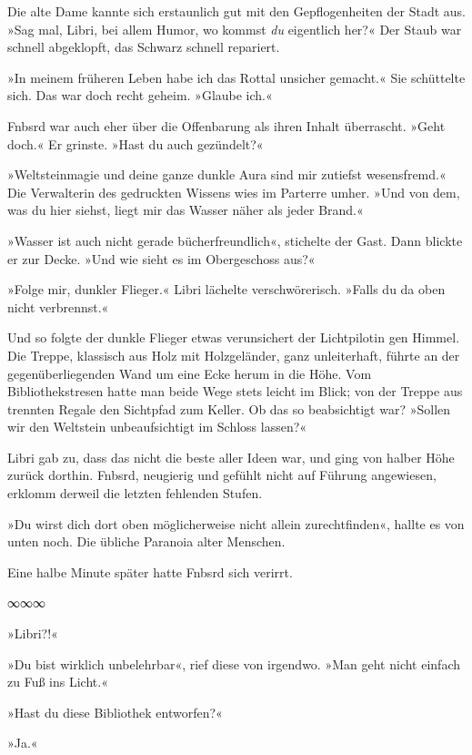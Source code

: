 Die alte Dame kannte sich erstaunlich gut mit den Gepflogenheiten der Stadt aus. »Sag mal, Libri, bei allem Humor, wo kommst \emph{du} eigentlich her?« Der Staub war schnell abgeklopft, das Schwarz schnell repariert.

»In meinem früheren Leben habe ich das Rottal unsicher gemacht.« Sie schüttelte sich. Das war doch recht geheim. »Glaube ich.«

Fnbsrd war auch eher über die Offenbarung als ihren Inhalt überrascht. »Geht doch.« Er grinste. »Hast du auch gezündelt?«

»Weltsteinmagie und deine ganze dunkle Aura sind mir zutiefst wesensfremd.« Die Verwalterin des gedruckten Wissens wies im Parterre umher. »Und von dem, was du hier siehst, liegt mir das Wasser näher als jeder Brand.«

»Wasser ist auch nicht gerade bücherfreundlich«, stichelte der Gast. Dann blickte er zur Decke. »Und wie sieht es im Obergeschoss aus?«

»Folge mir, dunkler Flieger.« Libri lächelte verschwörerisch. »Falls du da oben nicht verbrennst.«

Und so folgte der dunkle Flieger etwas verunsichert der Lichtpilotin gen Himmel. Die Treppe, klassisch aus Holz mit Holzgeländer, ganz unleiterhaft, führte an der gegenüberliegenden Wand um eine Ecke herum in die Höhe. Vom Bibliothekstresen hatte man beide Wege stets leicht im Blick; von der Treppe aus trennten Regale den Sichtpfad zum Keller. Ob das so beabsichtigt war? »Sollen wir den Weltstein unbeaufsichtigt im Schloss lassen?«

Libri gab zu, dass das nicht die beste aller Ideen war, und ging von halber Höhe zurück dorthin. Fnbsrd, neugierig und gefühlt nicht auf Führung angewiesen, erklomm derweil die letzten fehlenden Stufen.

»Du wirst dich dort oben möglicherweise nicht allein zurechtfinden«, hallte es von unten noch. Die übliche Paranoia alter Menschen.

Eine halbe Minute später hatte Fnbsrd sich verirrt.

\begin{center}
∞∞∞
\end{center}

»Libri?!«

»Du bist wirklich unbelehrbar«, rief diese von irgendwo. »Man geht nicht einfach zu Fuß ins Licht.«

»Hast du diese Bibliothek entworfen?«

»Ja.«

